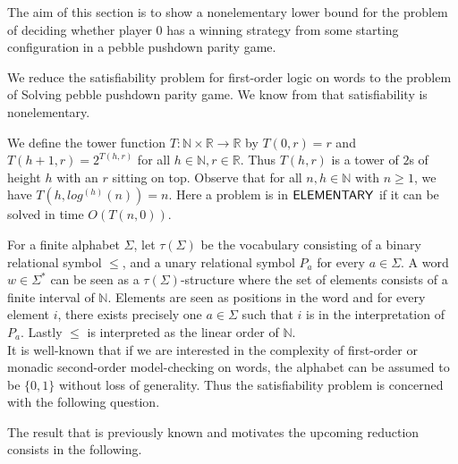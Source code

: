 \documentclass[a4paper,UKenglish,cleveref, autoref, thm-restate]{lipics-v2021}
\newcommand{\problemx}[3]{
	\vspace{0.2cm}
\par\noindent\underline{\sc#1}\par\nobreak\vskip.2\baselineskip
\begingroup\clubpenalty10000\widowpenalty10000
\setbox0\hbox{\bf INPUT:\ }\setbox1\hbox{\bf QUESTION:\ }
\dimen0=\wd0\ifnum\wd1>\dimen0\dimen0=\wd1\fi
\vskip-\parskip\noindent
\hbox to\dimen0{\box0\hfil}\hangindent\dimen0\hangafter1\ignorespaces#2\par
\vskip-\parskip\noindent
\hbox to\dimen0{\box1\hfil}\hangindent\dimen0\hangafter1\ignorespaces#3\par
\endgroup
	\vspace{-0.2cm}
}
\renewcommand{\R}{\mathbb{R}}
\newcommand{\N}{\mathbb{N}}
\begin{document}
The aim of this section is to show a nonelementary lower bound for the 
problem of deciding whether player $0$ has a winning strategy from some starting configuration in
a pebble pushdown parity game.

We reduce the satisfiability problem for first-order logic on words
to the problem of {\sc Solving pebble pushdown parity game}. 
We know from \cite{Sto74}
that satisfiability is nonelementary. 
%


We define the tower function $T : \N \times \R \to \R$ by $T(0,r) =r$ and
$T(h+1,r)= 2^{T(h,r)}$ for all $h \in \N, r \in \R$. Thus $T(h,r)$ is a tower of $2$s of height $h$ with an $r$ sitting on top.
Observe that for all $n,h \in \N$ with $n\geq 1$, we have
$T(h, log^{(h)}(n)) = n$.
%
% 
Here a problem is in ${\sf ELEMENTARY}$ if it can be solved in time $O ( T(n, 0) )$.

For a finite alphabet $\Sigma$,  let $\tau (\Sigma )$ be the vocabulary consisting of a binary relational symbol $\leq$,  and a unary relational symbol $P_a$ for every $a \in \Sigma$. 
A word $w \in \Sigma^*$ can be seen as a $\tau (\Sigma )$-structure where the set of elements consists of a finite interval of $\N$. Elements are seen as positions in the word and for every element $i$, there exists precisely one $a \in \Sigma$ such that $i$ is in the interpretation of $P_a$. Lastly $\leq$ is interpreted as the linear order of $\N$.\\


It is well-known that if we are interested in the complexity of first-order or monadic
second-order model-checking on words, the alphabet can be assumed to be $\{0,1\}$ without loss of generality.
Thus the satisfiability problem is concerned with the following question.



The result that is previously known and motivates the upcoming reduction consists in the following.
\end{document}
